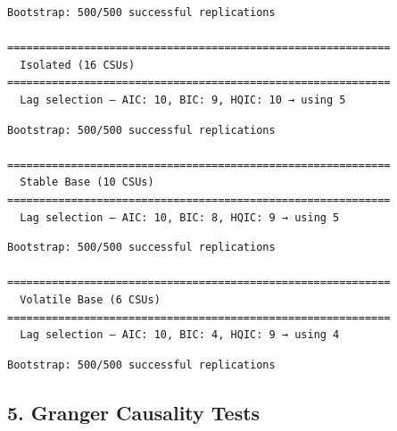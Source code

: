 \documentclass[11pt]{article}
\begin{document}
    \begin{Verbatim}[commandchars=\\\{\}]
  Bootstrap: 500/500 successful replications

============================================================
  Isolated (16 CSUs)
============================================================
  Lag selection — AIC: 10, BIC: 9, HQIC: 10 → using 5
    \end{Verbatim}

    \begin{Verbatim}[commandchars=\\\{\}]
  Bootstrap: 500/500 successful replications

============================================================
  Stable Base (10 CSUs)
============================================================
  Lag selection — AIC: 10, BIC: 8, HQIC: 9 → using 5
    \end{Verbatim}

    \begin{Verbatim}[commandchars=\\\{\}]
  Bootstrap: 500/500 successful replications

============================================================
  Volatile Base (6 CSUs)
============================================================
  Lag selection — AIC: 10, BIC: 4, HQIC: 9 → using 4
    \end{Verbatim}

    \begin{Verbatim}[commandchars=\\\{\}]
  Bootstrap: 500/500 successful replications
    \end{Verbatim}

    \subsection{5. Granger Causality Tests}\label{granger-causality-tests}
\end{document}
